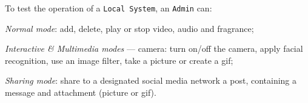To test the operation of a \texttt{Local System}, an \texttt{Admin} can:
\begin{item-c}
\item \emph{Normal mode}: add, delete, play or stop video, audio and fragrance;
\item \emph{Interactive \& Multimedia modes} --- camera: turn on/off the camera, apply facial
  recognition, use an image filter, take a picture or create a \gls{gif};
\item \emph{Sharing mode}: share to a designated social media network a post,
  containing a message and attachment (picture or \gls{gif}). 
\end{item-c}
%
%
%

